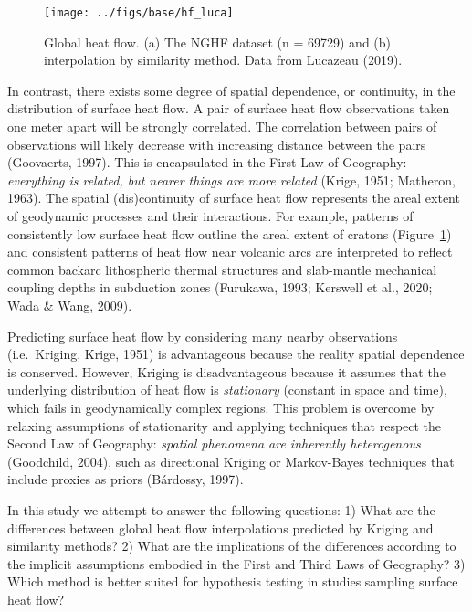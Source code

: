 \documentclass[draft,linenumbers]{agujournal2018}
\begin{document}
\begin{figure}[h]

{\centering \texttt{[image: ../figs/base/hf\_luca]} 

}

\caption{Global heat flow. (a) The NGHF dataset (n = 69729) and (b) interpolation by similarity method. Data from Lucazeau (2019).}\label{fig:lucahf}
\end{figure}

In contrast, there exists some degree of spatial dependence, or
continuity, in the distribution of surface heat flow. A pair of surface
heat flow observations taken one meter apart will be strongly
correlated. The correlation between pairs of observations will likely
decrease with increasing distance between the pairs (Goovaerts, 1997).
This is encapsulated in the First Law of Geography: \emph{everything is
related, but nearer things are more related} (Krige, 1951; Matheron,
1963). The spatial (dis)continuity of surface heat flow represents the
areal extent of geodynamic processes and their interactions. For
example, patterns of consistently low surface heat flow outline the
areal extent of cratons (Figure~\ref{fig:lucahf}) and consistent
patterns of heat flow near volcanic arcs are interpreted to reflect
common backarc lithospheric thermal structures and slab-mantle
mechanical coupling depths in subduction zones (Furukawa, 1993; Kerswell
et al., 2020; Wada \& Wang, 2009).

Predicting surface heat flow by considering many nearby observations
(i.e.~Kriging, Krige, 1951) is advantageous because the reality spatial
dependence is conserved. However, Kriging is disadvantageous because it
assumes that the underlying distribution of heat flow is
\emph{stationary} (constant in space and time), which fails in
geodynamically complex regions. This problem is overcome by relaxing
assumptions of stationarity and applying techniques that respect the
Second Law of Geography: \emph{spatial phenomena are inherently
heterogenous} (Goodchild, 2004), such as directional Kriging or
Markov-Bayes techniques that include proxies as priors (Bárdossy, 1997).

In this study we attempt to answer the following questions: 1) What are
the differences between global heat flow interpolations predicted by
Kriging and similarity methods? 2) What are the implications of the
differences according to the implicit assumptions embodied in the First
and Third Laws of Geography? 3) Which method is better suited for
hypothesis testing in studies sampling surface heat flow?
\end{document}
